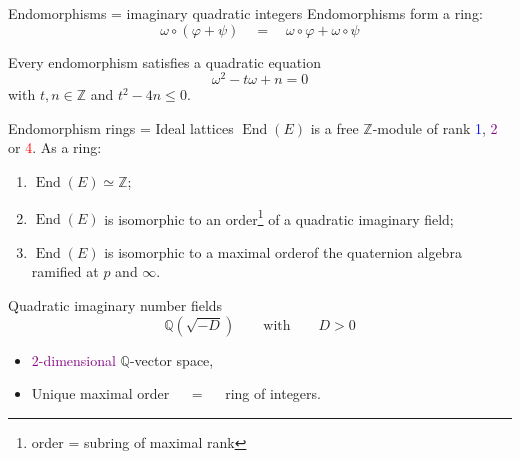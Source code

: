 \documentclass[aspectratio=169]{beamer}
\newcommand{\End}{\operatorname{End}}
\begin{document}

\begin{frame}{Endomorphisms = imaginary quadratic integers}
  \large
  Endomorphisms form a ring:
  \[ω ∘ (φ + ψ) \quad=\quad ω∘φ + ω∘ψ\]

  \bigskip
  Every endomorphism satisfies a quadratic equation
  \[ω^2 - tω + n = 0\]
  with $t,n ∈ ℤ$ and $t^2 - 4n ≤ 0$.
\end{frame}


\begin{frame}{Endomorphism rings = Ideal lattices}
  \Large $\End(E)$ is a free $ℤ$-module of rank \textcolor{blue}{1},
  \textcolor{purple}{2} or \textcolor{red}{4}. As a ring:

  \bigskip
  \begin{enumerate}
    \setlength{\itemsep}{1em}
  \item[\color{blue}1)] $\End(E) ≃ ℤ$;
  \item[\color{purple}2)] $\End(E)$ is isomorphic to an
    order\footnote[1]{order = subring of maximal rank} of a quadratic
    imaginary field;
  \item[\color{red}4)] $\End(E)$ is isomorphic to a maximal
    order\footnotemark[1] of the quaternion algebra ramified at $p$
    and $∞$.
  \end{enumerate}
\end{frame}


\begin{frame}{\color{purple}Quadratic imaginary number fields}
  \large
  \[ℚ(\sqrt{-D}) \qquad\text{with}\qquad D>0\]

  \bigskip
  \begin{itemize}
    \setlength{\itemsep}{1em}
  \item \textcolor{purple}{$2$-dimensional} $ℚ$-vector space,
  \item Unique maximal order $\quad=\quad$ ring of integers.
  \end{itemize}
\end{frame}

\end{document}
